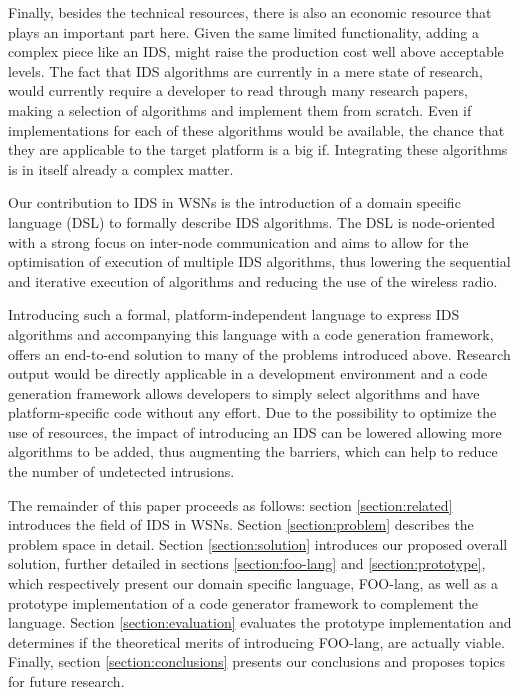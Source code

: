 \documentclass[conference]{IEEEtran}
\begin{document}
Finally, besides the technical resources, there is also an economic resource
that plays an important part here. Given the same limited functionality, adding
a complex piece like an IDS, might raise the production cost well above
acceptable levels. The fact that IDS algorithms are currently in a mere state
of research, would currently require a developer to read through many research
papers, making a selection of algorithms and implement them from scratch. Even
if implementations for each of these algorithms would be available, the chance
that they are applicable to the target platform is a big if. Integrating these
algorithms is in itself already a complex matter.

Our contribution to IDS in WSNs is the introduction of a domain specific
language (DSL) to formally describe IDS algorithms. The DSL is node-oriented
with a strong focus on inter-node communication and aims to allow for the
optimisation of execution of multiple IDS algorithms, thus lowering the
sequential and iterative execution of algorithms and reducing the use of the
wireless radio.

Introducing such a formal, platform-independent language to express IDS
algorithms and accompanying this language with a code generation framework,
offers an end-to-end solution to many of the problems introduced above.
Research output would be directly applicable in a development environment and a
code generation framework allows developers to simply select algorithms and
have platform-specific code without any effort. Due to the possibility to
optimize the use of resources, the impact of introducing an IDS can be lowered
allowing more algorithms to be added, thus augmenting the barriers, which can
help to reduce the number of undetected intrusions.

The remainder of this paper proceeds as follows: section \ref{section:related}
introduces the field of IDS in WSNs. Section \ref{section:problem} describes
the problem space in detail. Section \ref{section:solution} introduces our
proposed overall solution, further detailed in sections \ref{section:foo-lang}
and \ref{section:prototype}, which respectively present our domain specific
language, FOO-lang, as well as a prototype implementation of a code generator
framework to complement the language. Section \ref{section:evaluation}
evaluates the prototype implementation and determines if the theoretical merits
of introducing FOO-lang, are actually viable. Finally, section
\ref{section:conclusions} presents our conclusions and proposes topics for
future research.
\end{document}
